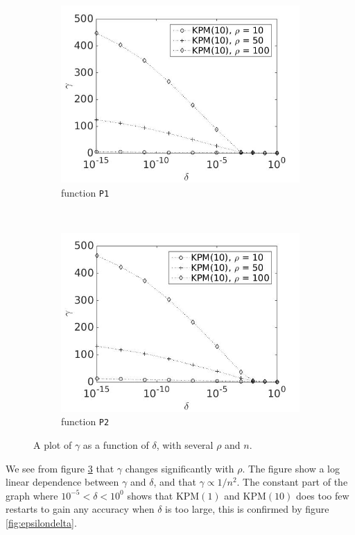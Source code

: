 \begin{figure}[H]
        \begin{subfigure}[b]{0.45\textwidth}
                \includegraphics[width=\textwidth]{fig/s13antvstol1m10}
                \caption{function \texttt{P1}}
                \label{fig:gammadelta3}
        \end{subfigure}
~
        \begin{subfigure}[b]{0.45\textwidth}
                \includegraphics[width=\textwidth]{fig/s14antvstol2m10}
                \caption{ function \texttt{P2}}
                \label{fig:gammadelta4}
        \end{subfigure}
        
        \caption{A plot of $\gamma$ as a function of $\delta$, with several $\rho$ and $n$.} \label{fig:gammadelta}
\end{figure}
We see from figure \ref{fig:gammadelta} that $\gamma$ changes significantly with $\rho$. The figure show a log linear dependence between $\gamma$ and $\delta$, and that $\gamma \propto 1/n^2$. 
The constant part of the graph where $ 10^{-5}<\delta< {10^0} $ shows that KPM$(1)$ and KPM$(10)$ does too few restarts to gain any accuracy when $\delta$ is too large, this is confirmed by figure \ref{fig:epsilondelta}. 

